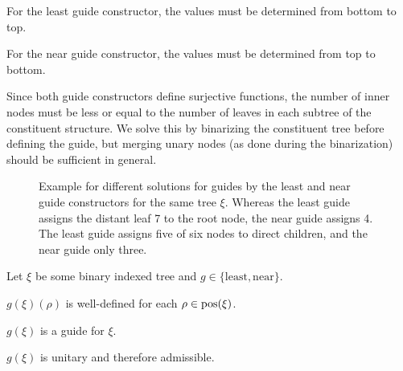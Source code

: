 \documentclass[../../document.tex]{subfiles}
\begin{document}
    \begin{inparaenum}
        \item For the least guide constructor, the values must be determined from bottom to top.
        \item For the near guide constructor, the values must be determined from top to bottom.
    \end{inparaenum}
    Since both guide constructors define surjective functions, the number of inner nodes must be less or equal to the number of leaves in each subtree of the constituent structure.
    We solve this by binarizing the constituent tree before defining the guide, but merging unary nodes (as done during the binarization) should be sufficient in general.

    \begin{figure}
        \null\hfill
        \begin{minipage}{.35\linewidth}
            \centering
            
        \end{minipage}
        \hfill
        \begin{minipage}{.35\linewidth}
            \centering
            
        \end{minipage}
        \hfill\null
        \caption{\label{fig:guides:diff}
            Example for different solutions for guides by the least and near guide constructors for the same tree \(\xi\).
            Whereas the least guide assigns the distant leaf 7 to the root node, the near guide assigns 4.
            The least guide assigns five of six nodes to direct children, and the near guide only three.
        }
    \end{figure}

    \begin{claim}
        Let \(\xi\) be some binary indexed tree and \(g \in \{\mathrm{least}, \mathrm{near}\}\).
        \begin{compactenum}
            \item \(g(\xi)(\rho)\) is well-defined for each \(\rho \in \operatorname{pos}(\xi)\).
            \item \(g(\xi)\) is a guide for \(\xi\).
            \item \(g(\xi)\) is unitary and therefore admissible.
        \end{compactenum}
    \end{claim}
\end{document}
